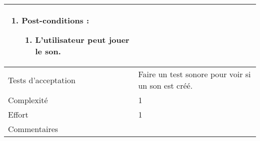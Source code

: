 \begin{longtable}{|l|p{}|}
\begin{enumerate}[label*=\arabic*.]
\begin{enumerate}[label*=\arabic*.]
\begin{enumerate}[label*=\arabic*.]
                    \end{enumerate}
                    \item Post-conditions :
                    \begin{enumerate}[label*=\arabic*.]
                        \item L'utilisateur peut jouer le son.
                    \end{enumerate}
                \end{enumerate}
        \end{enumerate} \\
\hline
    Tests d'acceptation & Faire un test sonore pour voir si un son est créé. \\
\hline
    Complexité & 1 \\
\hline
    Effort & 1 \\
\hline
    Commentaires &  \\
\hline
\end{longtable}

